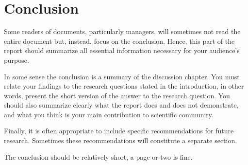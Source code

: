 \chapter{Conclusion}
\label{chap:conclusion} 

Some readers of documents, particularly managers, will sometimes not read the entire document but, instead, focus on the conclusion. Hence, this part of the report should summarize all essential information necessary for your audience's purpose. 

In some sense the conclusion is a summary of the discussion chapter. You must relate your findings to the research questions stated in the  introduction, in other words, present the short version of the answer to the research question.
You should also summarize clearly what the report does and does not demonstrate, and what you think is your main contribution to scientific community.

Finally, it is often appropriate to include specific recommendations for future research. Sometimes these recommendations will constitute a separate section.

The conclusion should be relatively short, a page or two is fine.


\lipsum[81-87]

